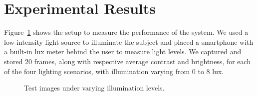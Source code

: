 \documentclass[english,hidelinks]{sbrt}
\begin{document}


\section{Experimental Results}
\label{sec: IV}


Figure~\ref{fig:grid} shows the setup to measure the performance of the system.
We used a low-intensity light source to illuminate the subject and placed a smartphone with a built-in lux meter behind the user to measure light levels.
We captured and stored 20 frames, along with respective average contrast and brightness, for each of the four lighting scenarios, with illumination varying from 0 to 8 lux.

\begin{figure}
    \centering
    \hfill
    \vspace{0.5cm}
    \hfill
    \caption{Test images under varying illumination levels.}
    \label{fig:grid}
\end{figure}
\end{document}
